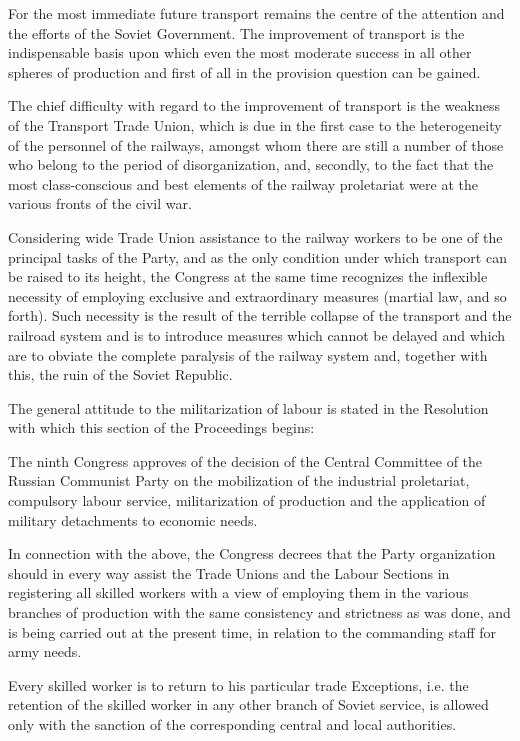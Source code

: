 \begin{displayquote}
For the most immediate future transport remains the centre of the attention and the efforts of the Soviet Government. The improvement of transport is the indispensable basis upon which even the most moderate success in all other spheres of production and first of all in the provision question can be gained.

The chief difficulty with regard to the improvement of transport is the weakness of the Transport Trade Union, which is due in the first case to the heterogeneity of the personnel of the railways, amongst whom there are still a number of those who belong to the period of disorganization, and, secondly, to the fact that the most class-conscious and best elements of the railway proletariat were at the various fronts of the civil war.

Considering wide Trade Union assistance to the railway workers to be one of the principal tasks of the Party, and as the only condition under which transport can be raised to its height, the Congress at the same time recognizes the inflexible necessity of employing exclusive and extraordinary measures (martial law, and so forth). Such necessity is the result of the terrible collapse of the transport and the railroad system and is to introduce measures which cannot be delayed and which are to obviate the complete paralysis of the railway system and, together with this, the ruin of the Soviet Republic.
\end{displayquote}
The general attitude to the militarization of labour is stated in the Resolution with which this section of the Proceedings begins:
\begin{displayquote}
The ninth Congress approves of the decision of the Central Committee of the Russian Communist Party on the mobilization of the industrial proletariat, compulsory labour service, militarization of production and the application of military detachments to economic needs.

In connection with the above, the Congress decrees that the Party organization should in every way assist the Trade Unions and the Labour Sections in registering all skilled workers with a view of employing them in the various branches of production with the same consistency and strictness as was done, and is being carried out at the present time, in relation to the commanding staff for army needs.

Every skilled worker is to return to his particular trade Exceptions, i.e. the retention of the skilled worker in any other branch of Soviet service, is allowed only with the sanction of the corresponding central and local authorities.
\end{displayquote}
